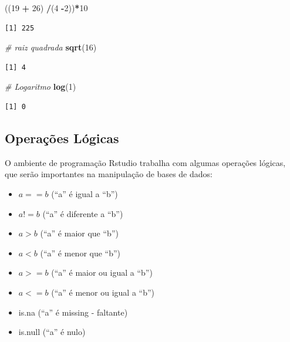 \documentclass[12pt,portuguese,oneside]{book}
\newenvironment{Shaded}{\begin{snugshade}}{\end{snugshade}}
\newcommand{\KeywordTok}[1]{\textcolor[rgb]{0.13,0.29,0.53}{\textbf{#1}}}
\newcommand{\DecValTok}[1]{\textcolor[rgb]{0.00,0.00,0.81}{#1}}
\newcommand{\StringTok}[1]{\textcolor[rgb]{0.31,0.60,0.02}{#1}}
\newcommand{\CommentTok}[1]{\textcolor[rgb]{0.56,0.35,0.01}{\textit{#1}}}
\newcommand{\OperatorTok}[1]{\textcolor[rgb]{0.81,0.36,0.00}{\textbf{#1}}}
\newcommand{\NormalTok}[1]{#1}
\providecommand{\tightlist}{%
  \setlength{\itemsep}{0pt}\setlength{\parskip}{0pt}}
\begin{document}
\begin{Shaded}
\begin{Highlighting}[]
\NormalTok{((}\DecValTok{19} \OperatorTok{+}\StringTok{ }\DecValTok{26}\NormalTok{) }\OperatorTok{/}\NormalTok{(}\DecValTok{4} \OperatorTok{-}\DecValTok{2}\NormalTok{))}\OperatorTok{*}\DecValTok{10}
\end{Highlighting}
\end{Shaded}

\begin{verbatim}
[1] 225
\end{verbatim}

\begin{Shaded}
\begin{Highlighting}[]
\CommentTok{# raiz quadrada}
\KeywordTok{sqrt}\NormalTok{(}\DecValTok{16}\NormalTok{)}
\end{Highlighting}
\end{Shaded}

\begin{verbatim}
[1] 4
\end{verbatim}

\begin{Shaded}
\begin{Highlighting}[]
\CommentTok{# Logaritmo }
\KeywordTok{log}\NormalTok{(}\DecValTok{1}\NormalTok{)}
\end{Highlighting}
\end{Shaded}

\begin{verbatim}
[1] 0
\end{verbatim}

\subsection{Operações Lógicas}\label{operacoes-logicas}

O ambiente de programação Rstudio trabalha com algumas operações
lógicas, que serão importantes na manipulação de bases de dados:

\begin{itemize}
\tightlist
\item
  \(a == b\) (``a'' é igual a ``b'')
\item
  \(a != b\) (``a'' é diferente a ``b'')
\item
  \(a > b\) (``a'' é maior que ``b'')
\item
  \(a < b\) (``a'' é menor que ``b'')
\item
  \(a >= b\) (``a'' é maior ou igual a ``b'')
\item
  \(a <= b\) (``a'' é menor ou igual a ``b'')
\item
  is.na (``a'' é missing - faltante)
\item
  is.null (``a'' é nulo)
\end{itemize}
\end{document}
